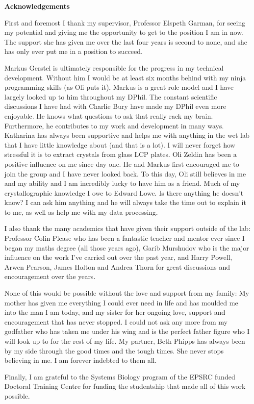 \newenvironment{acknowledgements}%
{\cleardoublepage\thispagestyle{empty}\vfill\begin{center}%
\bfseries Acknowledgements\end{center}}%
{\vfill}
\begin{acknowledgements}
\small
\singlespacing
First and foremost I thank my supervisor, Professor Elspeth Garman, for seeing my potential and giving me the opportunity to get to the position I am in now.
The support she has given me over the last four years is second to none, and she has only ever put me in a position to succeed.

Markus Gerstel is ultimately responsible for the progress in my technical development.
Without him I would be at least six months behind with my ninja programming skills (as Oli puts it).
Markus is a great role model and I have largely looked up to him throughout my DPhil.
The constant scientific discussions I have had with Charlie Bury have made my DPhil even more enjoyable.
He knows what questions to ask that really rack my brain.
Furthermore, he contributes to my work and development in many ways.
Katharina has always been supportive and helps me with anything in the wet lab that I have little knowledge about (and that is a lot).
I will never forget how stressful it is to extract crystals from glass LCP plates.
Oli Zeldin has been a positive influence on me since day one.
He and Markus first encouraged me to join the group and I have never looked back.
To this day, Oli still believes in me and my ability and I am incredibly lucky to have him as a friend.
Much of my crystallographic knowledge I owe to Edward Lowe.
Is there anything he doesn't know?
I can ask him anything and he will always take the time out to explain it to me, as well as help me with my data processing.

I also thank the many academics that have given their support outside of the lab:
Professor Colin Please who has been a fantastic teacher and mentor ever since I began my maths degree (all those years ago), Garib Murshudov who is the major influence on the work I've carried out over the past year, and Harry Powell, Arwen Pearson, James Holton and Andrea Thorn for great discussions and encouragement over the years.

None of this would be possible without the love and support from my family:
My mother has given me everything I could ever need in life and has moulded me into the man I am today, and my sister for her ongoing love, support and encouragement that has never stopped.
I could not ask any more from my godfather who has taken me under his wing and is the perfect father figure who I will look up to for the rest of my life.
My partner, Beth Phipps has always been by my side through the good times and the tough times.
She never stops believing in me.
I am forever indebted to them all.

Finally, I am grateful to the Systems Biology program of the EPSRC funded Doctoral Training Centre for funding the studentship that made all of this work possible.
\end{acknowledgements}
